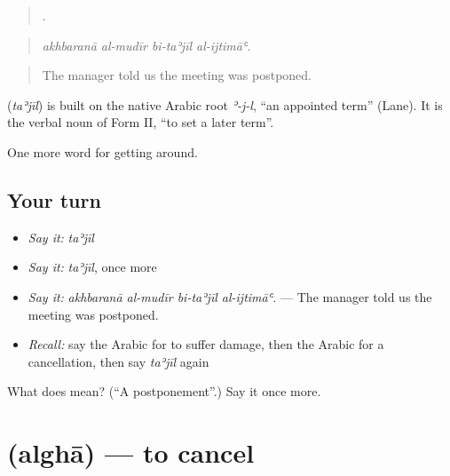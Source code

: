 \begin{quote}
   .
\end{quote}

\begin{quote}
\emph{akhbaranā al-mudīr bi-taʾjīl al-ijtimāʿ.}
\end{quote}

\begin{quote}
The manager told us the meeting was postponed.
\end{quote}

\begin{cousinweb}
\textbf{} (\emph{taʾjīl}) is built on the native Arabic root \emph{ʾ-j-l}, \textquotedblleft{}an appointed term\textquotedblright{} (Lane). It is the verbal noun of Form II, \textquotedblleft{}to set a later term\textquotedblright{}.
\end{cousinweb}

\begin{grammarlens}[title={What you've built}]
One more word for getting around.
\end{grammarlens}

\subsection*{Your turn}
\begin{itemize}
\raggedright
  \item \emph{Say it:} \emph{taʾjīl}
  \item \emph{Say it:} \emph{taʾjīl}, once more
  \item \emph{Say it:} \emph{akhbaranā al-mudīr bi-taʾjīl al-ijtimāʿ.} — The manager told us the meeting was postponed.
  \item \emph{Recall:} say the Arabic for to suffer damage, then the Arabic for a cancellation, then say \emph{taʾjīl} again
\end{itemize}

\begin{tcolorbox}[breakable,colback=teal!4,colframe=teal!35!black,title={Before you move on}]
What does  mean? (\textquotedblleft{}A postponement\textquotedblright{}.) Say it once more.
\end{tcolorbox}
\section[\texorpdfstring{\ar{ألغى} (alghā)}{ألغى (alghā)}]{ (alghā) — to cancel}

